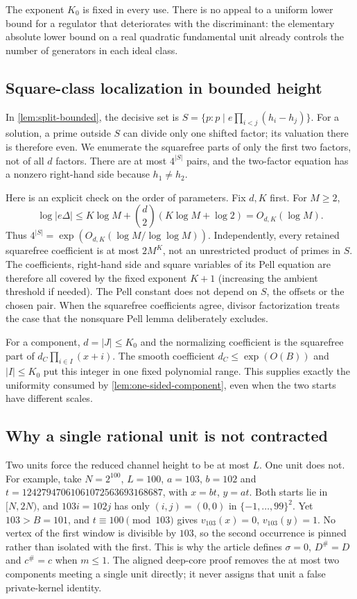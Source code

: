 The exponent $K_0$ is fixed in every use. There is no appeal to a uniform
lower bound for a regulator that deteriorates with the discriminant: the
elementary absolute lower bound on a real quadratic fundamental unit
already controls the number of generators in each ideal class.

\subsection{Square-class localization in bounded height}
\label{supp:sec:split-localization}
In \cref{lem:split-bounded}, the decisive set is
$S=\{p:p\mid e\prod_{i<j}(h_i-h_j)\}$.
For a solution, a prime outside $S$ can divide only one shifted factor;
its valuation there is therefore even. We enumerate the squarefree parts
of only the first two factors, not of all $d$ factors. There are at most
$4^{|S|}$ pairs, and the two-factor equation has a nonzero right-hand side
because $h_1\ne h_2$.

Here is an explicit check on the order of parameters. Fix $d,K$ first.
For $M\ge2$,
\[
 \log|e\Delta|\le K\log M+
         \binom d2(K\log M+\log2)=O_{d,K}(\log M).
\]
Thus $4^{|S|}=\exp(O_{d,K}(\log M/\log\log M))$.
Independently, every retained squarefree coefficient is at most $2M^K$,
not an unrestricted product of primes in $S$. The coefficients, right-hand
side and square variables of its Pell equation are therefore all covered
by the fixed exponent $K+1$ (increasing the ambient threshold if needed).
The Pell constant does not depend on $S$, the offsets or the chosen pair.
When the squarefree coefficients agree, divisor factorization treats the
case that the nonsquare Pell lemma deliberately excludes.

For a component, $d=|J|\le K_0$ and the normalizing coefficient is the
squarefree part of $d_C\prod_{i\in I}(x+i)$. The smooth coefficient
$d_C\le\exp(O(B))$ and $|I|\le K_0$ put this integer in one fixed
polynomial range. This supplies exactly the uniformity consumed by
\cref{lem:one-sided-component}, even when the two starts have different
scales.

\subsection{Why a single rational unit is not contracted}
Two units force the reduced channel height to be at most $L$. One unit
does not. For example, take $N=2^{100}$, $L=100$, $a=103$, $b=102$ and
$t=12427947061061072563693168687$, with $x=bt$, $y=at$.
Both starts lie in $[N,2N)$, and $103i=102j$ has only $(i,j)=(0,0)$
in $\{-1,\ldots,99\}^2$. Yet $103>B=101$, and $t\equiv100\pmod{103}$
gives $v_{103}(x)=0$, $v_{103}(y)=1$.
No vertex of the first window is divisible by $103$, so the second
occurrence is pinned rather than isolated with the first. This is why the
article defines $\sigma=0$, $D^\#=D$ and $c^\#=c$ when $m\le1$.
The aligned deep-core proof removes the at most two components meeting
a single unit directly; it never assigns that unit a false private-kernel
identity.

